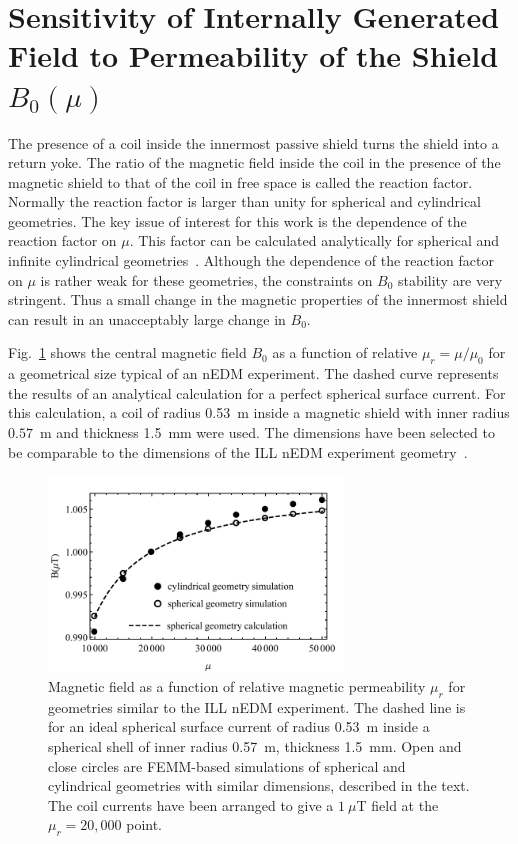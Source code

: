 \section{Sensitivity of Internally Generated Field to Permeability of the Shield $B_0(\mu)$\label{sec:calculation}}

The presence of a coil inside the innermost passive shield turns the
shield into a return yoke.  The ratio of the magnetic field inside the
coil in the presence of the magnetic shield to that of the coil in
free space is called the reaction factor.  Normally the reaction
factor is larger than unity for spherical and cylindrical geometries.
The key issue of interest for this work is the dependence of the
reaction factor on $\mu$.  This factor can be calculated analytically
for spherical and infinite cylindrical
geometries~\cite{bib:bidinostimartin,bib:urankar}.  Although the
dependence of the reaction factor on $\mu$ is rather weak for these
geometries, the constraints on $B_0$ stability are very stringent.
Thus a small change in the magnetic properties of the innermost shield
can result in an unacceptably large change in $B_0$.

Fig.~\ref{fig:Magnetic_Field} shows the central magnetic field $B_0$
as a function of relative $\mu_r=\mu/\mu_0$ for a geometrical size
typical of an nEDM experiment.  The dashed curve represents the
results of an analytical calculation for a perfect spherical surface
current.  For this calculation, a coil of radius 0.53~m inside a
magnetic shield with inner radius $0.57$~m and thickness 1.5~mm were
used.  The dimensions have been selected to be comparable to the
dimensions of the ILL nEDM experiment
geometry~\cite{bib:baker,bib:knecht}.

\begin{figure}[h!]
\begin{center}
   \includegraphics[width=0.7\textwidth]{femm_and_calcs.pdf}
    \caption{Magnetic field as a function of relative magnetic
      permeability $\mu_r$ for geometries similar to the ILL nEDM
      experiment.  The dashed line is for an ideal spherical surface
      current of radius 0.53~m inside a spherical shell of inner
      radius 0.57~m, thickness 1.5~mm.  Open and close circles are
      FEMM-based simulations of spherical and cylindrical geometries
      with similar dimensions, described in the text.  The coil
      currents have been arranged to give a $1~\mu$T field at the
      $\mu_r=20,000$ point.}
    \label{fig:Magnetic_Field}
    \end{center}
\end{figure} 


